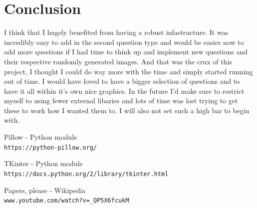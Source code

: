 \documentclass[twocolumn]{article}   %
\begin{document}
\section{Conclusion}
I think that I hugely benefited from having a robust infastructure. It was incredibly easy to add in the second question type and would be easier now to add more questions if I had time to think up and implement new questions and their respective randomly generated images. And that was the crux of this project, I thought I could do way more with the time and simply started running out of time. I would have loved to have a bigger selection of questions and to have it all within it's own nice graphics. In the future I'd make sure to restrict myself to using fewer external libaries and lots of time was lost trying to get these to work how I wanted them to. I will also not set such a high bar to begin with.

\begin{thebibliography}{9}

  Pillow - Python module
  \\\texttt{https://python-pillow.org/}

  TKinter - Python module
  \\\texttt{https://docs.python.org/2/library/tkinter.html}

  Papers, please - Wikipedia
  \\\texttt{www.youtube.com/watch?v=\_QP5X6fcukM}

\end{thebibliography}


\end{document}
